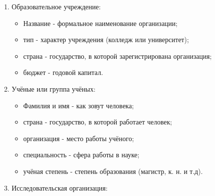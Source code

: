 \documentclass[14pt]{extreport}
\begin{document}
{\begin{enumerate}
\begin{itemize}
            \item тип объекта, его подтип - природа объекта;
            
            \item склонение - Координата объекта на небесной сфере;  
            
            \item видимые размеры - размеры в градусах;
            
            \item видимая звёздная величина - мера яркости.
        \end{itemize}

        \item Образовательное учреждение:

        \begin{itemize}
            \item Название - формальное наименование организации;
        
            \item тип - характер учреждения (колледж или университет);
            
            \item страна - государство, в которой зарегистрирована организация;

            \item бюджет - годовой капитал.
        \end{itemize}

        \item Учёные или группа учёных:

        \begin{itemize}
            \item Фамилия и имя - как зовут человека;
        
            \item страна - государство, в которой работает человек;
            
            \item организация - место работы учёного;  
            
            \item специальность - сфера работы в науке;
            
            \item учёная степень - степень образования (магистр, к. н. и т.д).
        \end{itemize}

        

        \item Исследовательская организация:


\end{enumerate}}
\end{document}

